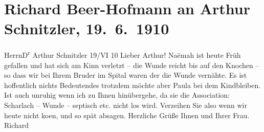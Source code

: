 

         
         \renewcommand{\erwaehntePersonen}{Personen: Naëmah Beer-Hofmann, Paula Beer-Hofmann, Julius Schnitzler, Olga Schnitzler}
         \renewcommand{\erwaehnteOrte}{Orte: Wien}
         \renewcommand{\erwaehnteWerke}{}
               \section[Richard Beer-Hofmann an Arthur Schnitzler, 19. 6. 1910]{ Richard Beer-Hofmann an Arthur Schnitzler, 19. 6. 1910}\nopagebreak{}\rehead{ }\begin{ledgroupsized}[t]{13cm}\normalsize\beginnumbering \toendnotes[C]{\smallbreak\pagebreak[2]} 
\toendnotes[C]{\smallbreak}\pstart{}{\pb}Herrn\pend{}\pstart{}D\textsuperscript{r} Arthur Schnitzler\pend{}{\bigskip}\pstart
           \raggedleft{}{\pb}19/VI 10\pend
           \pstart
           Lieber Arthur!{ }Naëmah ist heute Früh gefallen und
               hat sich am Kinn verletzt – die Wunde reicht bis auf den Knochen – so dass wir bei
               Ihrem Bruder im Spital waren
               der die Wunde vernähte. Es ist hoffentlich nichts Bedeutendes trotzdem möchte aber
                  Paula bei dem Kindbleiben. Ist auch unruhig wenn ich
               zu Ihnen hinübergehe, da sie die Association: Scharlach – Wunde – septisch etc. nicht
               los wird. Verzeihen Sie also wenn wir heute nicht {\pb}ko{\geminationm}en,
               und so spät absagen. Herzliche Grüße Ihnen und Ihrer Frau.\pend
           \pstart \spacefill\mbox{Richard}\pend{}
         
         \endnumbering{}\end{ledgroupsized}  \newcommand{\dateiname}{L01936}\newcommand{\titel}{Richard Beer-Hofmann an Arthur Schnitzler, 19. 6. 1910}\newcommand{\editorInnen}{Martin Anton Müller und Gerd-Hermann Susen}
      